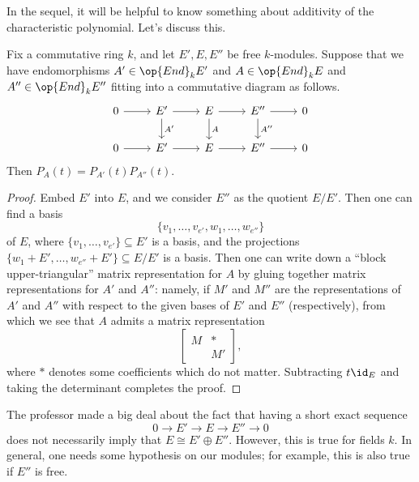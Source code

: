 \documentclass[../notes.tex]{subfiles}
\begin{document}
In the sequel, it will be helpful to know something about additivity of the characteristic polynomial. Let's discuss this.
\begin{theorem} \label{thm:char-poly-ses}
	Fix a commutative ring $k$, and let $E',E,E''$ be free $k$-modules. Suppose that we have endomorphisms $A'\in\op{End}_kE'$ and $A\in\op{End}_kE$ and $A''\in\op{End}_kE''$ fitting into a commutative diagram as follows.
	\[\begin{tikzcd}
		0 & {E'} & E & {E''} & 0 \\
		0 & {E'} & E & {E''} & 0
		\arrow[from=1-1, to=1-2]
		\arrow[from=1-2, to=1-3]
		\arrow["{A'}", from=1-2, to=2-2]
		\arrow[from=1-3, to=1-4]
		\arrow["A", from=1-3, to=2-3]
		\arrow[from=1-4, to=1-5]
		\arrow["{A''}", from=1-4, to=2-4]
		\arrow[from=2-1, to=2-2]
		\arrow[from=2-2, to=2-3]
		\arrow[from=2-3, to=2-4]
		\arrow[from=2-4, to=2-5]
	\end{tikzcd}\]
	Then $P_A(t)=P_{A'}(t)P_{A''}(t)$.
\end{theorem}
\begin{proof}
	Embed $E'$ into $E$, and we consider $E''$ as the quotient $E/E'$. Then one can find a basis
	\[\{v_1,\ldots,v_{e'},w_1,\ldots,w_{e''}\}\]
	of $E$, where $\{v_1,\ldots,v_{e'}\}\subseteq E'$ is a basis, and the projections $\{w_1+E',\ldots,w_{e''}+E'\}\subseteq E/E'$ is a basis. Then one can write down a ``block upper-triangular'' matrix representation for $A$ by gluing together matrix representations for $A'$ and $A''$: namely, if $M'$ and $M''$ are the representations of $A'$ and $A''$ with respect to the given bases of $E'$ and $E''$ (respectively), from which we see that $A$ admits a matrix representation
	\[\begin{bmatrix}
		M & * \\ & M'
	\end{bmatrix},\]
	where $*$ denotes some coefficients which do not matter. Subtracting $t\id_E$ and taking the determinant completes the proof.
\end{proof}
\begin{remark}
	The professor made a big deal about the fact that having a short exact sequence
	\[0\to E'\to E\to E''\to0\]
	does not necessarily imply that $E\cong E'\oplus E''$. However, this is true for fields $k$. In general, one needs some hypothesis on our modules; for example, this is also true if $E''$ is free.
\end{remark}
\end{document}
